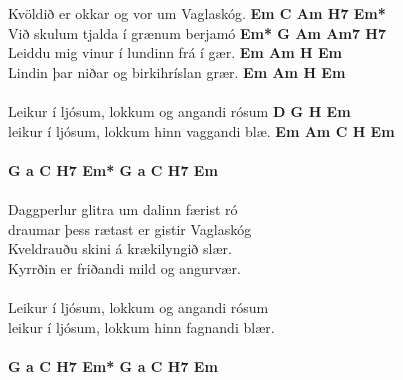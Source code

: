 Kvöldið er okkar og vor um Vaglaskóg. \textbf{Em C Am H7 Em*}\\
Við skulum tjalda í grænum berjamó \textbf{Em* G Am Am7 H7}\\
Leiddu mig vinur í lundinn frá í gær. \textbf{Em Am H Em}\\
Lindin þar niðar og birkihríslan grær. \textbf{Em Am H Em}\\
\\
 Leikur í ljósum, lokkum og angandi rósum \textbf{D G H Em}\\
 leikur í ljósum, lokkum hinn vaggandi blæ. \textbf{Em Am C H Em}\\
\\
 \textbf{G a C H7 Em* G a C H7 Em}\\
\\
Daggperlur glitra um dalinn færist ró   \\
draumar þess rætast er gistir Vaglaskóg   \\
Kveldrauðu skini á krækilyngið slær.\\
Kyrrðin er friðandi mild og angurvær.   \\
\\
 Leikur í ljósum, lokkum og angandi rósum   \\
 leikur í ljósum, lokkum hinn fagnandi blær.\\
\\
 \textbf{G a C H7 Em* G a C H7 Em}\\
\newpage


